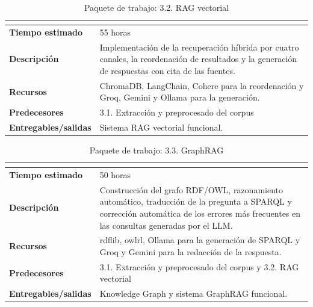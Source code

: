 \documentclass[11pt, a4paper]{report}
\begin{document}
	\begin{table}[H]
		\centering
		\begin{tabularx}{\linewidth}{|>{\bfseries}l|X|}
			\hline
			\rowcolor{pkg-desarrollo}
			\multicolumn{2}{|c|}{\textcolor{white}{\textbf{3.2. RAG vectorial}}} \\
			\hline
			Tiempo estimado & 55 horas \\
			\hline
			\rowcolor{fila-alterna}
			Descripción & Implementación de la recuperación híbrida por cuatro canales, la reordenación de resultados y la generación de respuestas con cita de las fuentes. \\
			\hline
			Recursos & ChromaDB, LangChain, Cohere para la reordenación y Groq, Gemini y Ollama para la generación. \\
			\hline
			\rowcolor{fila-alterna}
			Predecesores & 3.1. Extracción y preprocesado del corpus \\
			\hline
			Entregables/salidas & Sistema RAG vectorial funcional. \\
			\hline
		\end{tabularx}
		\caption{Paquete de trabajo: 3.2. RAG vectorial}
		\label{tab:pkg-rag-vectorial}
	\end{table}

	\begin{table}[H]
		\centering
		\begin{tabularx}{\linewidth}{|>{\bfseries}l|X|}
			\hline
			\rowcolor{pkg-desarrollo}
			\multicolumn{2}{|c|}{\textcolor{white}{\textbf{3.3. GraphRAG}}} \\
			\hline
			Tiempo estimado & 50 horas \\
			\hline
			\rowcolor{fila-alterna}
			Descripción & Construcción del grafo RDF/OWL, razonamiento automático,
			traducción de la pregunta a SPARQL y corrección automática de los errores más frecuentes en las consultas generadas por el LLM. \\
			\hline
			Recursos & rdflib, owlrl, Ollama para la generación de SPARQL y Groq y Gemini para la redacción de la respuesta. \\
			\hline
			\rowcolor{fila-alterna}
			Predecesores & 3.1. Extracción y preprocesado del corpus y 3.2. RAG vectorial \\
			\hline
			Entregables/salidas & Knowledge Graph y sistema GraphRAG funcional. \\
			\hline
		\end{tabularx}
		\caption{Paquete de trabajo: 3.3. GraphRAG}
		\label{tab:pkg-graphrag}
	\end{table}
\end{document}
